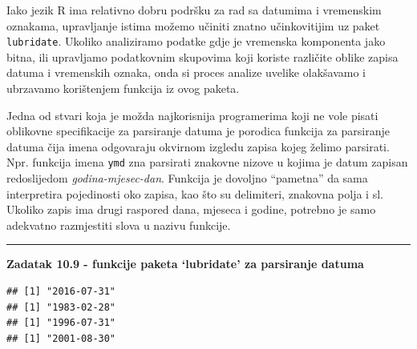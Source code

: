 \documentclass[]{book}
\newenvironment{Shaded}{\begin{snugshade}}{\end{snugshade}}
\newcommand{\KeywordTok}[1]{\textcolor[rgb]{0.13,0.29,0.53}{\textbf{#1}}}
\newcommand{\StringTok}[1]{\textcolor[rgb]{0.31,0.60,0.02}{#1}}
\newcommand{\CommentTok}[1]{\textcolor[rgb]{0.56,0.35,0.01}{\textit{#1}}}
\newcommand{\NormalTok}[1]{#1}
\theoremstyle{definition}
\theoremstyle{definition}
\theoremstyle{definition}
\theoremstyle{remark}
\begin{document}
Iako jezik R ima relativno dobru podršku za rad sa datumima i vremenskim
oznakama, upravljanje istima možemo učiniti znatno učinkovitijim uz
paket \texttt{lubridate}. Ukoliko analiziramo podatke gdje je vremenska
komponenta jako bitna, ili upravljamo podatkovnim skupovima koji koriste
različite oblike zapisa datuma i vremenskih oznaka, onda si proces
analize uvelike olakšavamo i ubrzavamo korištenjem funkcija iz ovog
paketa.

Jedna od stvari koja je možda najkorisnija programerima koji ne vole
pisati oblikovne specifikacije za parsiranje datuma je porodica funkcija
za parsiranje datuma čija imena odgovaraju okvirnom izgledu zapisa kojeg
želimo parsirati. Npr. funkcija imena \texttt{ymd} zna parsirati
znakovne nizove u kojima je datum zapisan redoslijedom
\emph{godina-mjesec-dan}. Funkcija je dovoljno ``pametna'' da sama
interpretira pojedinosti oko zapisa, kao što su delimiteri, znakovna
polja i sl. Ukoliko zapis ima drugi raspored dana, mjeseca i godine,
potrebno je samo adekvatno razmjestiti slova u nazivu funkcije.

\begin{center}\rule{0.5\linewidth}{\linethickness}\end{center}

\textbf{Zadatak 10.9 - funkcije paketa `lubridate' za parsiranje datuma}

\begin{Shaded}
\end{Shaded}

\begin{Shaded}
\end{Shaded}

\begin{verbatim}
## [1] "2016-07-31"
## [1] "1983-02-28"
## [1] "1996-07-31"
## [1] "2001-08-30"
\end{verbatim}
\end{document}
